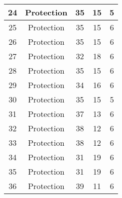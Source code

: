 \documentclass[results.tex]{subfiles}
\begin{document}
\begin{center}
\begin{tabular}{| c || c | c | c | c |}
            \hline
            24                      & Protection                   & 35                     & 15                      & 5                    \\
            \hline
            25                      & Protection                   & 35                     & 15                      & 6                    \\
            \hline
            26                      & Protection                   & 35                     & 15                      & 6                    \\
            \hline
            27                      & Protection                   & 32                     & 18                      & 6                    \\
            \hline
            28                      & Protection                   & 35                     & 15                      & 6                    \\
            \hline
            29                      & Protection                   & 34                     & 16                      & 6                    \\
            \hline
            30                      & Protection                   & 35                     & 15                      & 5                    \\
            \hline
            31                      & Protection                   & 37                     & 13                      & 6                    \\
            \hline
            32                      & Protection                   & 38                     & 12                      & 6                    \\
            \hline
            33                      & Protection                   & 38                     & 12                      & 6                    \\
            \hline
            34                      & Protection                   & 31                     & 19                      & 6                    \\
            \hline
            35                      & Protection                   & 31                     & 19                      & 6                    \\
            \hline
            36                      & Protection                   & 39                     & 11                      & 6                    \\

\end{tabular}
\end{center}
\end{document}
